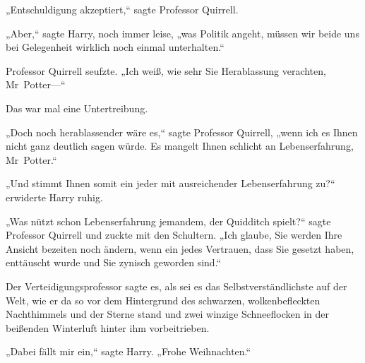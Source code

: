 „Entschuldigung akzeptiert,“ sagte Professor Quirrell.

„Aber,“ sagte Harry, noch immer leise, „was Politik angeht, müssen wir beide uns bei Gelegenheit wirklich noch einmal unterhalten.“


Professor Quirrell seufzte. „Ich weiß, wie sehr Sie Herablassung verachten, Mr~Potter—“

Das war mal eine Untertreibung.

„Doch noch herablassender wäre es,“ sagte Professor Quirrell, „wenn ich es Ihnen nicht ganz deutlich sagen würde. Es mangelt Ihnen schlicht an Lebenserfahrung, Mr~Potter.“

„Und stimmt Ihnen somit ein jeder mit ausreichender Lebenserfahrung zu?“ erwiderte Harry ruhig.

„Was nützt schon Lebenserfahrung jemandem, der Quidditch spielt?“ sagte Professor Quirrell und zuckte mit den Schultern. „Ich glaube, Sie werden Ihre Ansicht bezeiten noch ändern, wenn ein jedes Vertrauen, dass Sie gesetzt haben, enttäuscht wurde und Sie zynisch geworden sind.“

Der Verteidigungsprofessor sagte es, als sei es das Selbstverständlichste auf der Welt, wie er da so vor dem Hintergrund des schwarzen, wolkenbefleckten Nachthimmels und der Sterne stand und zwei winzige Schneeflocken in der beißenden Winterluft hinter ihm vorbeitrieben.

„Dabei fällt mir ein,“ sagte Harry. „Frohe Weihnachten.“

